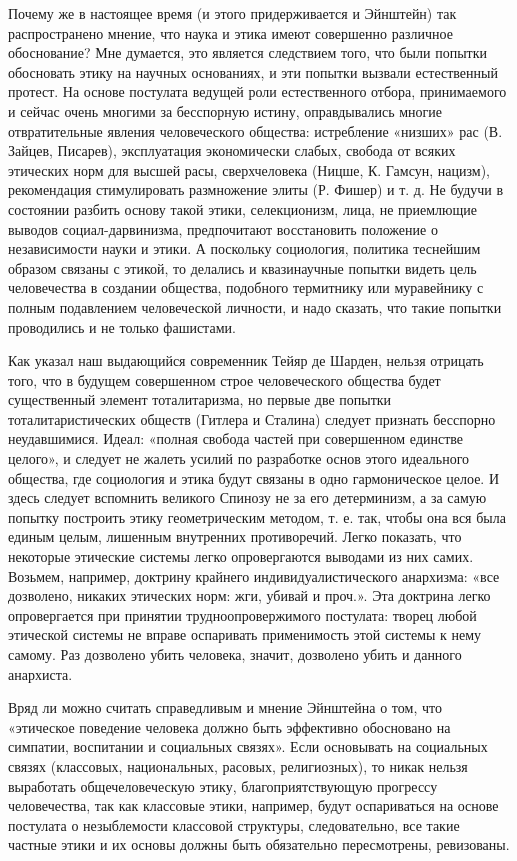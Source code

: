 Почему же в настоящее время (и этого придерживается и Эйнштейн) так
распространено мнение, что наука и этика имеют совершенно различное
обоснование? Мне думается, это является следствием того, что были попытки
обосновать этику на научных основаниях, и эти попытки вызвали естественный
протест. На основе постулата ведущей роли естественного отбора, принимаемого и
сейчас очень многими за бесспорную истину, оправдывались многие отвратительные
явления человеческого общества: истребление «низших» рас (В. Зайцев, Писарев),
эксплуатация экономически слабых, свобода от всяких этических норм для высшей
расы, сверхчеловека (Ницше, К. Гамсун, нацизм), рекомендация стимулировать
размножение элиты (Р. Фишер) и т. д. Не будучи в состоянии разбить основу такой
этики, селекционизм, лица, не приемлющие выводов социал-дарвинизма,
предпочитают восстановить положение о независимости науки и этики. А поскольку
социология, политика теснейшим образом связаны с этикой, то делались и
квазинаучные попытки видеть цель человечества в создании общества, подобного
термитнику или муравейнику с полным подавлением человеческой личности, и надо
сказать, что такие попытки проводились и не только фашистами.

Как указал наш выдающийся современник Тейяр де Шарден, нельзя отрицать того,
что в будущем совершенном строе человеческого общества будет существенный
элемент тоталитаризма, но первые две попытки тоталитаристических обществ
(Гитлера и Сталина) следует признать бесспорно неудавшимися. Идеал: «полная
свобода частей при совершенном единстве целого», и следует не жалеть усилий по
разработке основ этого идеального общества, где социология и этика будут
связаны в одно гармоническое целое. И здесь следует вспомнить великого Спинозу
не за его детерминизм, а за самую попытку построить этику геометрическим
методом, т. е. так, чтобы она вся была единым целым, лишенным внутренних
противоречий. Легко показать, что некоторые этические системы легко
опровергаются выводами из них самих. Возьмем, например, доктрину крайнего
индивидуалистического анархизма: «все дозволено, никаких этических норм: жги,
убивай и проч.». Эта доктрина легко опровергается при принятии
трудноопровержимого постулата: творец любой этической системы не вправе
оспаривать применимость этой системы к нему самому. Раз дозволено убить
человека, значит, дозволено убить и данного анархиста.

Вряд ли можно считать справедливым и мнение Эйнштейна о том, что «этическое
поведение человека должно быть эффективно обосновано на симпатии, воспитании и
социальных связях». Если основывать на социальных связях (классовых,
национальных, расовых, религиозных), то никак нельзя выработать
общечеловеческую этику, благоприятствующую прогрессу человечества, так как
классовые этики, например, будут оспариваться на основе постулата о
незыблемости классовой структуры, следовательно, все такие частные этики и их
основы должны быть обязательно пересмотрены, ревизованы.

